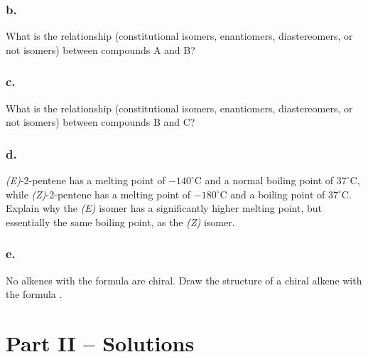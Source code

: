 \documentclass[11pt,letterpaper]{article}
\begin{document}
\subsubsection*{b.}
What is the relationship (constitutional isomers, enantiomers, diastereomers, or not isomers) between compounds A and B?
\vspace{1.5cm}

\subsubsection*{c.}
What is the relationship (constitutional isomers, enantiomers, diastereomers, or not isomers) between compounds B and C?
\vspace{1.5cm}

\subsubsection*{d.}
\textit{(E)}-2-pentene has a melting point of $-140^{\circ}\text{C}$ and a normal boiling point of $37^{\circ}\text{C}$, while \textit{(Z)}-2-pentene has a melting point of $-180^{\circ}\text{C}$ and a boiling point of $37^{\circ}\text{C}$. Explain why the \textit{(E)} isomer has a significantly higher melting point, but essentially the same boiling point, as the \textit{(Z)} isomer.
\vspace{3cm}

\subsubsection*{e.}
No alkenes with the formula  are chiral. Draw the structure of a chiral alkene with the formula .
\vspace{3cm}

\newpage
\section*{Part II -- Solutions}
\end{document}
